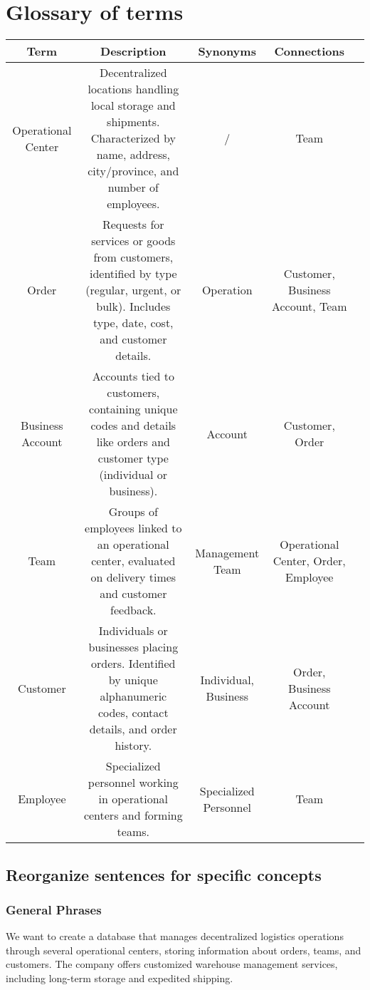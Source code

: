 \section{Glossary of terms}
\begin{table}[h!]
\begin{tabular}{|c|c|c|c|c|}
\hline
\textbf{Term} & \textbf{Description} & \textbf{Synonyms} & \textbf{Connections} \\
\hline
Operational Center & Decentralized locations handling local storage and shipments. Characterized by name, address, city/province, and number of employees. & / & Team \\
\hline
Order & Requests for services or goods from customers, identified by type (regular, urgent, or bulk). Includes type, date, cost, and customer details. & Operation & Customer, Business Account, Team \\
\hline
Business Account & Accounts tied to customers, containing unique codes and details like orders and customer type (individual or business). & Account & Customer, Order \\
\hline
Team & Groups of employees linked to an operational center, evaluated on delivery times and customer feedback. & Management Team & Operational Center, Order, Employee \\
\hline
Customer & Individuals or businesses placing orders. Identified by unique alphanumeric codes, contact details, and order history. & Individual, Business & Order, Business Account \\
\hline
Employee & Specialized personnel working in operational centers and forming teams. & Specialized Personnel & Team \\
\hline
\end{tabular}
\end{table}

\subsection{Reorganize sentences for specific concepts}

\subsubsection{General Phrases}
We want to create a database that manages decentralized logistics operations through several operational centers, storing information about orders, teams, and customers. The company offers customized warehouse management services, including long-term storage and expedited shipping.

